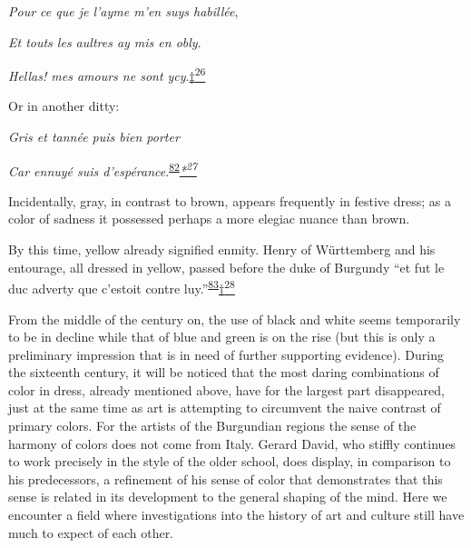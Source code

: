 \emph{Pour ce que je l'ayme m'en suys habillée},

\emph{Et touts les aultres ay mis en obly}.

\emph{Hellas! mes amours ne sont
ycy}.\protect\hypertarget{20_ILLUSTRATIONS_FOLLOW_PAGE.xhtmlux5cux23id_2701}{\protect\hyperlink{23_NOTES.xhtmlux5cux23id_2702}{‡\textsuperscript{26}}}

\protect\hypertarget{20_ILLUSTRATIONS_FOLLOW_PAGE.xhtmlux5cux23page_328}{}{}Or
in another ditty:

\emph{Gris et tannée puis bien porter}

\emph{Car ennuyé suis
d'espérance}.\textsuperscript{\protect\hypertarget{20_ILLUSTRATIONS_FOLLOW_PAGE.xhtmlux5cux23id_310}{\protect\hyperlink{23_NOTES.xhtmlux5cux23id_311}{82}}}\emph{\protect\hypertarget{20_ILLUSTRATIONS_FOLLOW_PAGE.xhtmlux5cux23id_2703}{\protect\hyperlink{23_NOTES.xhtmlux5cux23id_2704}{*\textsuperscript{27}}}}

Incidentally, gray, in contrast to brown, appears frequently in festive
dress; as a color of sadness it possessed perhaps a more elegiac nuance
than brown.

By this time, yellow already signified enmity. Henry of Württemberg and
his entourage, all dressed in yellow, passed before the duke of Burgundy
``et fut le duc adverty que c'estoit contre
luy.''\textsuperscript{\protect\hypertarget{20_ILLUSTRATIONS_FOLLOW_PAGE.xhtmlux5cux23id_308}{\protect\hyperlink{23_NOTES.xhtmlux5cux23id_309}{83}}}\protect\hypertarget{20_ILLUSTRATIONS_FOLLOW_PAGE.xhtmlux5cux23id_2705}{\protect\hyperlink{23_NOTES.xhtmlux5cux23id_2706}{†\textsuperscript{28}}}

From the middle of the century on, the use of black and white seems
temporarily to be in decline while that of blue and green is on the rise
(but this is only a preliminary impression that is in need of further
supporting evidence). During the sixteenth century, it will be noticed
that the most daring combinations of color in dress, already mentioned
above, have for the largest part disappeared, just at the same time as
art is attempting to circumvent the naive contrast of primary colors.
For the artists of the Burgundian regions the sense of the harmony of
colors does not come from Italy. Gerard David, who stiffly continues to
work precisely in the style of the older school, does display, in
comparison to his predecessors, a refinement of his sense of color that
demonstrates that this sense is related in its development to the
general shaping of the mind. Here we encounter a field where
investigations into the history of art and culture still have much to
expect of each other.
